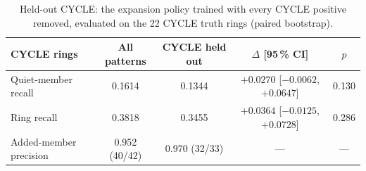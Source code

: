 \begin{table}[t]
\centering
\caption{Held-out CYCLE: the expansion policy trained with every
CYCLE positive removed, evaluated on the 22 CYCLE truth rings (paired bootstrap).}
\label{tab:heldout-cycle}
\small
\begin{tabular}{lcccc}
\toprule
CYCLE rings & All patterns & CYCLE held out & $\Delta$ [95\,\% CI] & $p$ \\
\midrule
Quiet-member recall & 0.1614 & 0.1344 & $+0.0270$ [$-0.0062$, $+0.0647$] & 0.130 \\ %
Ring recall & 0.3818 & 0.3455 & $+0.0364$ [$-0.0125$, $+0.0728$] & 0.286 \\ %
Added-member precision & 0.952 (40/42) & 0.970 (32/33) & --- & --- \\ %
\bottomrule
\end{tabular}
\end{table}
